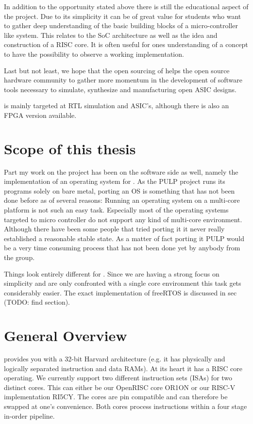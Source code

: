 In addition to the opportunity stated above there is still the educational aspect of the project. Due to its simplicity it can be of great value for students who want to gather deep understanding of the basic building blocks of a micro-controller like system. This relates to the SoC architecture as well as the idea and construction of a RISC core. It is often useful for ones understanding of a concept to have the possibility to observe a working implementation.

Last but not least, we hope that the open sourcing of \pulpino helps the open source hardware community to gather more momentum in the development of software tools necessary to simulate, synthesize and manufacturing open ASIC designs.

\pulpino is mainly targeted at RTL simulation and ASIC's, although there is also an FPGA version available.

\section{Scope of this thesis}

Part my work on the project has been on the software side as well, namely the implementation of an operating system for \pulpino. As the PULP project runs its programs solely on bare metal, porting an OS is something that has not been done before as of several reasons: Running an operating system on a multi-core platform is not such an easy task. Especially most of the operating systems targeted to micro controller do not support any kind of multi-core environment. Although there have been some people that tried porting it it never really established a reasonable stable state. As a matter of fact porting it PULP would be a very time consuming process that has not been done yet by anybody from the group.

Things look entirely different for \pulpino. Since we are having a strong focus on simplicity and are only confronted with a single core environment this task gets considerably easier. The exact implementation of freeRTOS is discussed in sec (TODO: find section).


\section{General Overview}

\pulpino provides you with a 32-bit Harvard architecture (e.g. it has physically and logically separated instruction and data RAMs). At its heart it has a \gls{RISC} core operating. We currently support two different instruction sets (ISAs) for two distinct cores. This can either be our OpenRISC core OR1ON or our RISC-V implementation RI5CY. The cores are pin compatible and can therefore be swapped at one's convenience. Both cores process instructions within a four stage in-order pipeline.

